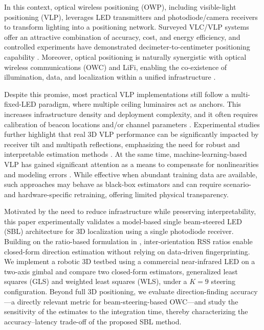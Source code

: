 In this context, optical wireless positioning (OWP), including visible-light positioning (VLP), leverages LED transmitters and photodiode/camera receivers to transform lighting into a positioning network. Surveyed VLC/VLP systems offer an attractive combination of accuracy, cost, and energy efficiency, and controlled experiments have demonstrated decimeter-to-centimeter positioning capability \cite{Wang2024SensorsSurvey,Zhu2024ComSTSurvey}. Moreover, optical positioning is naturally synergistic with optical wireless communications (OWC) and LiFi, enabling the co-existence of illumination, data, and localization within a unified infrastructure \cite{Haas2018LiFi,Kahn1997}.

Despite this promise, most practical VLP implementations still follow a multi-fixed-LED paradigm, where multiple ceiling luminaires act as anchors. This increases infrastructure density and deployment complexity, and it often requires calibration of beacon locations and/or channel parameters \cite{Zhuang2018Survey,Amsters2021RobotCalibration}. Experimental studies further highlight that real 3D VLP performance can be significantly impacted by receiver tilt and multipath reflections, emphasizing the need for robust and interpretable estimation methods \cite{Almadani2021OptCom}. At the same time, machine-learning-based VLP has gained significant attention as a means to compensate for nonlinearities and modeling errors \cite{TranHa2022MLReview}. While effective when abundant training data are available, such approaches may behave as black-box estimators and can require scenario- and hardware-specific retraining, offering limited physical transparency.

Motivated by the need to reduce infrastructure while preserving interpretability, this paper experimentally validates a model-based single beam-steered LED (SBL) architecture for 3D localization using a single photodiode receiver. Building on the ratio-based formulation in \cite{acuna2025model}, inter-orientation RSS ratios enable closed-form direction estimation without relying on data-driven fingerprinting. We implement a robotic 3D testbed using a commercial near-infrared LED on a two-axis gimbal and compare two closed-form estimators, generalized least squares (GLS) and weighted least squares (WLS), under a $K\!=\!9$ steering configuration. Beyond full 3D positioning, we evaluate direction-finding accuracy---a directly relevant metric for beam-steering-based OWC---and study the sensitivity of the estimates to the integration time, thereby characterizing the accuracy--latency trade-off of the proposed SBL method.

